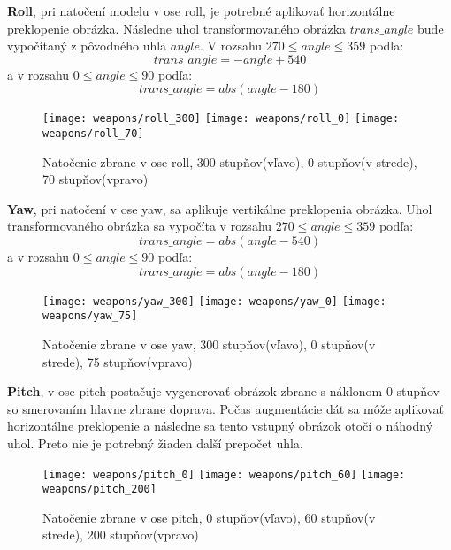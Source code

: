 \textbf{Roll}, pri natočení modelu v ose roll, je potrebné aplikovať horizontálne preklopenie obrázka.
Následne uhol transformovaného obrázka $trans\_angle$ bude vypočítaný z pôvodného uhla $angle$.
V rozsahu $270 \leq angle \leq 359$ podľa:
\begin{equation}
    trans\_angle = -angle + 540 
\end{equation}
a v rozsahu $0 \leq angle \leq 90$ podľa:
\begin{equation}
    trans\_angle = abs(angle - 180)
\end{equation}

\begin{figure}[H]
    \centering
    \texttt{[image: weapons/roll\_300]}
    \quad
    \texttt{[image: weapons/roll\_0]}
    \quad
    \texttt{[image: weapons/roll\_70]}
    \caption{Natočenie zbrane v ose roll, 300 stupňov(vľavo), 0 stupňov(v strede), 70 stupňov(vpravo)}
    \label{pic:rollrotation}
\end{figure}

\textbf{Yaw}, pri natočení v ose yaw, sa aplikuje vertikálne preklopenia obrázka.
Uhol transformovaného obrázka sa vypočíta v rozsahu $270 \leq angle \leq 359$ podľa:
\begin{equation}
    trans\_angle = abs(angle - 540)
\end{equation}
a v rozsahu $0 \leq angle \leq 90$ podľa:
\begin{equation}
    trans\_angle = abs(angle - 180)
\end{equation}

\begin{figure}[H]
    \centering
    \texttt{[image: weapons/yaw\_300]}
    \quad
    \texttt{[image: weapons/yaw\_0]}
    \quad
    \texttt{[image: weapons/yaw\_75]}
    \caption{Natočenie zbrane v ose yaw, 300 stupňov(vľavo), 0 stupňov(v strede), 75 stupňov(vpravo)}
    \label{pic:yawrotation}
\end{figure}

\textbf{Pitch}, v ose pitch postačuje vygenerovať obrázok zbrane s náklonom 0 stupňov so smerovaním hlavne zbrane doprava.
Počas augmentácie dát sa môže aplikovať horizontálne preklopenie a následne sa tento vstupný obrázok otočí o náhodný uhol.
Preto nie je potrebný žiaden další prepočet uhla.

\begin{figure}[H]
    \centering
    \texttt{[image: weapons/pitch\_0]}
    \quad
    \texttt{[image: weapons/pitch\_60]}
    \quad
    \texttt{[image: weapons/pitch\_200]}
    \caption{Natočenie zbrane v ose pitch, 0 stupňov(vľavo), 60 stupňov(v strede), 200 stupňov(vpravo)}
    \label{pic:yawrotation}
\end{figure}
